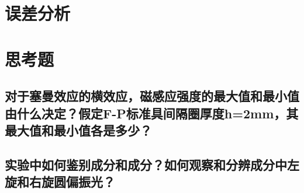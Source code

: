 \documentclass[a4paper]{article}
\begin{document}
\section{误差分析}

\section{思考题}
\subsection{对于塞曼效应的横效应，磁感应强度的最大值和最小值由什么决定？假定F-P标准具间隔圈厚度h=2mm，其最大值和最小值各是多少？}
\subsection{实验中如何鉴别成分和成分？如何观察和分辨成分中左旋和右旋圆偏振光？}

\nocite{jiaocai}

\end{document}
